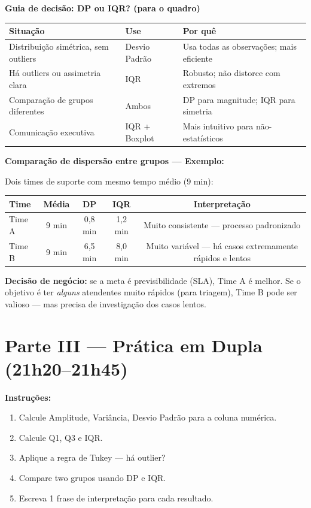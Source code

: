 \begin{BoardBox}
\textbf{Guia de decisão: DP ou IQR? (para o quadro)}
\begin{tabular}{|l|l|l|}
\hline
\textbf{Situação} & \textbf{Use} & \textbf{Por quê} \\
\hline
Distribuição simétrica, sem outliers & Desvio Padrão & Usa todas as observações; mais eficiente \\
Há outliers ou assimetria clara & IQR & Robusto; não distorce com extremos \\
Comparação de grupos diferentes & Ambos & DP para magnitude; IQR para simetria \\
Comunicação executiva & IQR + Boxplot & Mais intuitivo para não-estatísticos \\
\hline
\end{tabular}
\end{BoardBox}

\begin{SolvedBox}
\textbf{Comparação de dispersão entre grupos — Exemplo:}

Dois times de suporte com mesmo tempo médio (9 min):
\begin{center}
\begin{tabular}{|l|c|c|c|c|}
\hline
\textbf{Time} & \textbf{Média} & \textbf{DP} & \textbf{IQR} & \textbf{Interpretação} \\
\hline
Time A & 9 min & 0,8 min & 1,2 min & Muito consistente — processo padronizado \\
Time B & 9 min & 6,5 min & 8,0 min & Muito variável — há casos extremamente rápidos e lentos \\
\hline
\end{tabular}
\end{center}

\textbf{Decisão de negócio:} se a meta é previsibilidade (SLA), Time A é melhor.
Se o objetivo é ter \emph{alguns} atendentes muito rápidos (para triagem), Time B pode
ser valioso — mas precisa de investigação dos casos lentos.
\end{SolvedBox}

\section{Parte III — Prática em Dupla (21h20–21h45)}

\begin{SolvedBox}
\textbf{Instruções:}
\begin{enumerate}
  \item Calcule Amplitude, Variância, Desvio Padrão para a coluna numérica.
  \item Calcule Q1, Q3 e IQR.
  \item Aplique a regra de Tukey — há outlier?
  \item Compare two grupos usando DP e IQR.
  \item Escreva 1 frase de interpretação para cada resultado.
\end{enumerate}
\end{SolvedBox}

